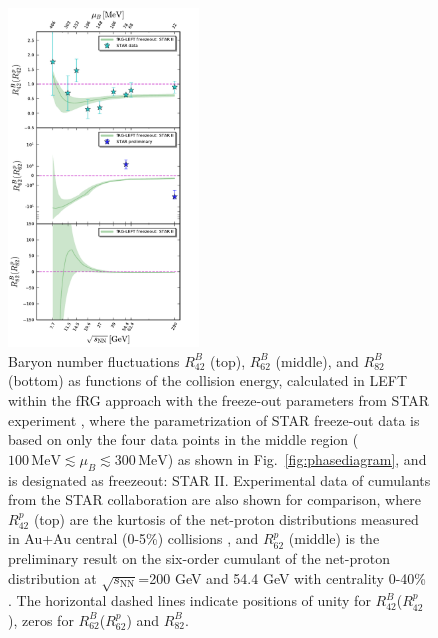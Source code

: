 \documentclass[%
reprint,
superscriptaddress,
showpacs,preprintnumbers,
amsmath,amssymb,
aps,
prd,
]{revtex4-1}
\def\Fig#1{Fig.~\ref{#1}} \def\Tab#1{Tab.~\ref{#1}}
\begin{document}
%
\begin{figure}[t]
\includegraphics[width=0.45\textwidth]{Rm2-sqrtS2}
\caption{Baryon number fluctuations $R^{B}_{42}$ (top), $R^{B}_{62}$ (middle), and $R^{B}_{82}$ (bottom) as functions of the collision energy, calculated in LEFT within the fRG approach with the freeze-out parameters from STAR experiment \cite{Adamczyk:2017iwn}, where the parametrization of STAR freeze-out data is based on only the four data points in the middle region ($100\,\mathrm{MeV}\lesssim\mu_B\lesssim 300\,\mathrm{MeV}$) as shown in \Fig{fig:phasediagram}, and is designated as freezeout: STAR II. Experimental data of cumulants from the STAR collaboration are also shown for comparison, where $R^{p}_{42}$ (top) are the kurtosis of the net-proton distributions measured in Au+Au central (0-5\%) collisions \cite{Adam:2020unf}, and $R^{p}_{62}$ (middle) is the preliminary result on the six-order cumulant of the net-proton distribution at $\sqrt{s_{\mathrm{NN}}}$=200 GeV and 54.4 GeV with centrality 0-40\% \cite{Nonaka:2020crv,Pandav:2020uzx}. The horizontal dashed lines indicate positions of unity for $R^{B}_{42}$($R^{p}_{42}$), zeros for $R^{B}_{62}$($R^{p}_{62}$) and $R^{B}_{82}$.}\label{fig:Rm2-sqrtS2}\vspace{-0.5cm}
\end{figure}
%
	
\end{document}
